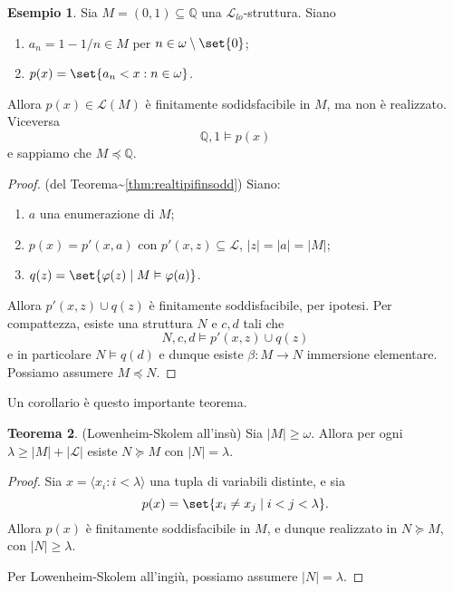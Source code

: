 \documentclass[10pt]{article}
\newcommand{\card}[1]{\left\vert #1 \right\vert}
\newcommand{\1}{\mathds{1}}
\newcommand{\Q}{\mathds{Q}}
\theoremstyle{definition}%
\newtheorem{thm}{Teorema}[section]
\newtheorem{esempio}[thm]{Esempio}
\theoremstyle{plain}
\theoremstyle{remark}
\begin{document}
\begin{esempio}
Sia \(M=(0,1) \subseteq \Q\) una \(\mathcal{L}_{lo}\)-struttura. Siano
\begin{enumerate}
\item \(a_{n}=1-1/n \in M\) per \(n \in \omega\setminus\set{0}\);
\item \(p(x) = \set{a_{n}<x: n \in \omega}\).
\end{enumerate}

Allora \(p(x) \in \mathcal{L}(M)\) è finitamente sodidsfacibile in \(M\), ma non è realizzato. Viceversa
\begin{equation*}
\Q,1\vDash p(x)
\end{equation*}
e sappiamo che \(M\preceq \Q\).
\end{esempio}
\begin{proof}
(del Teorema\textasciitilde{}\ref{thm:realtipifinsodd})\hspace{1em} Siano:
\begin{enumerate}
\item \(a\) una enumerazione di \(M\);
\item \(p(x)=p'(x,a)\) con \(p'(x,z) \subseteq\mathcal{L}\), \(|z|=\card{a}=\card{M}\);
\item \(q(z) = \set{\varphi(z)\mid M\vDash\varphi(a)}\).
\end{enumerate}

Allora \(p'(x,z)\cup q(z)\) è finitamente soddisfacibile, per ipotesi. Per compattezza, esiste una struttura \(N\) e \(c,d\) tali che
\begin{equation*}
N,c,d\vDash p'(x,z)\cup q(z)
\end{equation*}
e in particolare \(N\vDash q(d)\) e dunque esiste \(\beta:M\to N\) immersione elementare. Possiamo assumere \(M\preceq N\).
\end{proof}
Un corollario è questo importante teorema.
\begin{thm}
(Lowenheim-Skolem all'insù)\hspace{1em} Sia \(\card{M}\ge \omega\). Allora per ogni \(\lambda\ge \card{M}+\card{\mathcal{L}}\) esiste \(N\succeq M\) con \(\card{N}=\lambda\).
\end{thm}
\begin{proof}
Sia \(x=\langle x_{i}: i<\lambda\rangle\) una tupla di variabili distinte, e sia
\begin{equation*}
p(x)=\set{x_{i}\neq x_{j}\mid i<j<\lambda}.
\end{equation*}
Allora \(p(x)\) è finitamente soddisfacibile in \(M\), e dunque realizzato in \(N\succeq M\), con \(\card{N}\ge \lambda\).

Per Lowenheim-Skolem all'ingiù, possiamo assumere \(\card{N}=\lambda\).
\end{proof}
\end{document}
